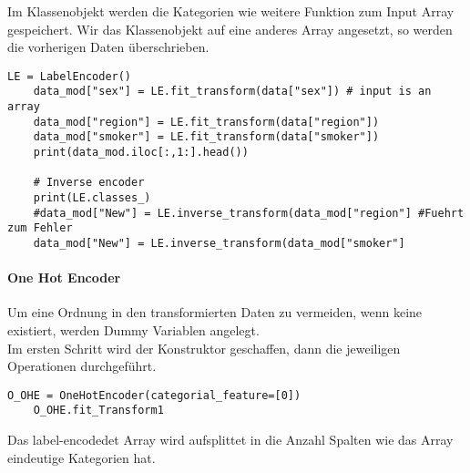 Im Klassenobjekt werden die Kategorien wie weitere Funktion zum Input Array gespeichert. Wir das Klassenobjekt auf eine anderes Array angesetzt, so werden die vorherigen Daten überschrieben.
\begin{lstlisting}[style=python]
	LE = LabelEncoder()
	data_mod["sex"] = LE.fit_transform(data["sex"]) # input is an array
	data_mod["region"] = LE.fit_transform(data["region"])
	data_mod["smoker"] = LE.fit_transform(data["smoker"])
	print(data_mod.iloc[:,1:].head())
	
	# Inverse encoder
	print(LE.classes_)
	#data_mod["New"] = LE.inverse_transform(data_mod["region"] #Fuehrt zum Fehler
	data_mod["New"] = LE.inverse_transform(data_mod["smoker"]
\end{lstlisting}

\paragraph{One Hot Encoder}
Um eine Ordnung in den transformierten Daten zu vermeiden, wenn keine existiert, werden Dummy Variablen angelegt. \\

Im ersten Schritt wird der Konstruktor geschaffen, dann die jeweiligen Operationen durchgeführt.
\begin{lstlisting}[style=python]
	O_OHE = OneHotEncoder(categorial_feature=[0])
	O_OHE.fit_Transform1	
\end{lstlisting}
Das label-encodedet Array wird aufsplittet in die Anzahl Spalten wie das Array eindeutige Kategorien hat.
